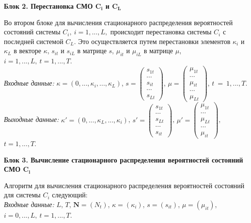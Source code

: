 \medskip
\textbf{Блок 2. Перестановка СМО $\boldsymbol{C_i}$ и $\boldsymbol{C_L}$}

Во втором блоке для вычисления стационарного распределения вероятностей состояний системы $C_i,~i=1,...,L,$ происходит перестановка системы $C_i$ с последней системой $C_L$. Это осуществляется путем перестановки элементов $\kappa_i$ и $\kappa_L$ в векторе $\kappa$, $s_{it}$ и $s_{iL}$ в матрице $s$, $\mu_{it}$ и $\mu_{iL}$ в матрице $\mu$, $i=1,...,L,~t=1,...,T$. \\
\textit{Входные данные:} $\kappa=(0,...,\kappa_i,...,\kappa_L)$, $s=\left( \begin{matrix}
s_{1t}\\
\cdots\\
s_{it}\\
\cdots\\
s_{Lt}
\end{matrix} \right )$, $\mu=\left( \begin{matrix}
\mu_{1t}\\
\cdots\\
\mu_{it}\\
\cdots\\
\mu_{Lt}
\end{matrix} \right )$, $t~=~1,...,T$. \\
\textit{Выходные данные:} $\kappa'=(0,...,\kappa_L,...,\kappa_i)$, $s'=\left( \begin{matrix}
s_{1t}\\
\cdots\\
s_{Lt}\\
\cdots\\
s_{it}
\end{matrix} \right )$, $\mu'=\left( \begin{matrix}
\mu_{1t}\\
\cdots\\
\mu_{Lt}\\
\cdots\\
\mu_{it}
\end{matrix} \right )$, $t=1,...,T$.

\medskip
\textbf{Блок 3. Вычисление стационарного распределения вероятностей состояний СМО $\boldsymbol{C_i}$}

Алгоритм для вычисления стационарного распределения вероятностей состояний для системы $C_i$ следующий:\\
\emph{Входные данные:} $L$, $T$, $\mathbf{N}=(N_t)$, $\kappa=(\kappa_i)$, $s=(s_{it})$, $\mu=(\mu_{it})$, $i=0,...,L,~t=1,...,T$.


